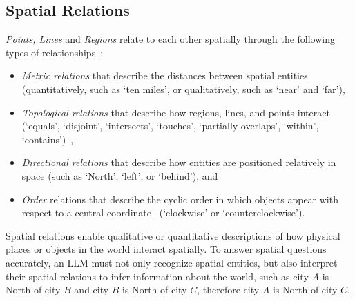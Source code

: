 \subsection{Spatial Relations}
\textit{Points, Lines} and \textit{Regions} relate to each other spatially through the following types of relationships~\cite{Carniel2020,Bertella2022,Carniel2023}: 
\begin{itemize}
    \item \textit{Metric relations} that describe the distances between spatial entities (quantitatively, such as `ten miles', or qualitatively, such as `near' and `far'),
    \item \textit{Topological relations} that describe how regions, lines, and points interact (`equals', `disjoint', `intersects', `touches', `partially overlaps', `within', `contains')~\cite{Minervino2023,Clementini1994,Strobl2008}, 
    \item \textit{Directional relations} that describe how entities are positioned relatively in space (such as `North', `left', or `behind'), and
    \item \textit{Order} relations that describe the cyclic order in which objects appear with respect to a central coordinate~\cite{Schwering2014} (`clockwise' or `counterclockwise').
\end{itemize}


%
Spatial relations enable qualitative or quantitative descriptions of how physical places or objects in the world interact spatially.
To answer spatial questions accurately, an LLM must not only recognize spatial entities, but also interpret their spatial relations to infer information about the world, such as city $A$ is North of city $B$ and city $B$ is North of city $C$, therefore city $A$ is North of city $C$.








